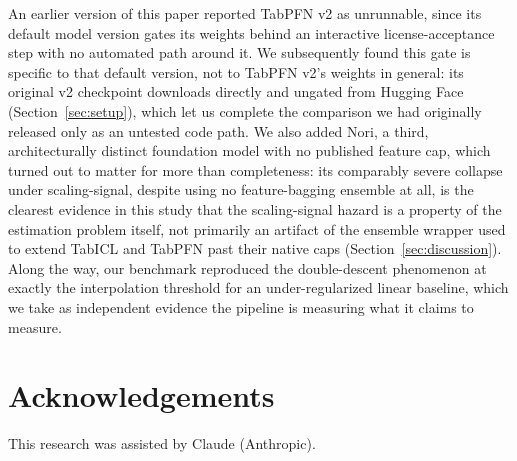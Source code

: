 \documentclass{article}
\begin{document}
An earlier version of this paper reported TabPFN v2 as unrunnable, since its default
model version gates its weights behind an interactive license-acceptance step with no
automated path around it. We subsequently found this gate is specific to that default
version, not to TabPFN v2's weights in general: its original v2 checkpoint downloads
directly and ungated from Hugging Face (Section~\ref{sec:setup}), which let us
complete the comparison we had originally released only as an untested code path. We
also added Nori, a third, architecturally distinct foundation model with no published
feature cap, which turned out to matter for more than completeness: its comparably
severe collapse under scaling-signal, despite using no feature-bagging ensemble at
all, is the clearest evidence in this study that the scaling-signal hazard is a
property of the estimation problem itself, not primarily an artifact of the ensemble
wrapper used to extend TabICL and TabPFN past their native caps (Section~\ref{sec:discussion}).
Along the way, our benchmark reproduced the double-descent phenomenon at exactly the
interpolation threshold for an under-regularized linear baseline, which we take as
independent evidence the pipeline is measuring what it claims to measure.

\section*{Acknowledgements}
This research was assisted by Claude (Anthropic).



\end{document}
